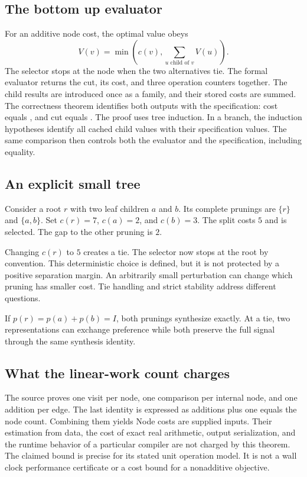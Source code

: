 \subsection{The bottom up evaluator}
For an additive node cost, the optimal value obeys
\[
V(v)=\min\left(c(v),\sum_{u\text{ child of }v}V(u)\right).
\]
The selector stops at the node when the two alternatives tie. The formal evaluator returns the cut, its cost, and three operation counters together.
The child results are introduced once as a family, and their stored costs are summed. The correctness theorem identifies both outputs with the specification: cost equals , and cut equals .
The proof uses tree induction. In a branch, the induction hypotheses identify all cached child values with their specification values. The same comparison then controls both the evaluator and the specification, including equality.

\subsection{An explicit small tree}
Consider a root $r$ with two leaf children $a$ and $b$. Its complete prunings are $\{r\}$ and $\{a,b\}$. Set $c(r)=7$, $c(a)=2$, and $c(b)=3$. The split costs $5$ and is selected. The gap to the other pruning is $2$.

Changing $c(r)$ to $5$ creates a tie. The selector now stops at the root by convention. This deterministic choice is defined, but it is not protected by a positive separation margin. An arbitrarily small perturbation can change which pruning has smaller cost. Tie handling and strict stability address different questions.

If $p(r)=p(a)+p(b)=I$, both prunings synthesize exactly. At a tie, two representations can exchange preference while both preserve the full signal through the same synthesis identity.

\subsection{What the linear-work count charges}
The source proves one visit per node, one comparison per internal node, and one addition per edge. The last identity is expressed as additions plus one equals the node count. Combining them yields
Node costs are supplied inputs. Their estimation from data, the cost of exact real arithmetic, output serialization, and the runtime behavior of a particular compiler are not charged by this theorem. The claimed bound is precise for its stated unit operation model. It is not a wall clock performance certificate or a cost bound for a nonadditive objective.

